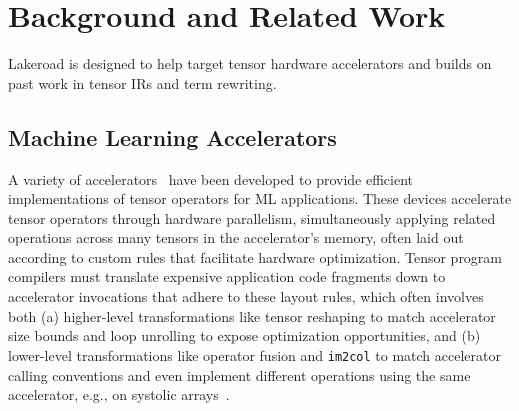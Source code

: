 \documentclass[prologue, dvipsnames, sigplan, screen, review, anonymous]{acmart}
\newcommand{\g}{Lakeroad\xspace}
\newcommand{\tcd}[1]{\texttt{#1}}
\begin{document}


\section{Background and Related Work}
\label{sec:background}

\g is designed to help target
  tensor hardware accelerators and
  builds on past work in
  tensor IRs and term rewriting.



\subsection{Machine Learning Accelerators}

A variety of accelerators~\cite{
    jouppi2017tpu, chen2016eyeriss, moreau2018vta, markidis2018tensorcore, nvdla}
  have been developed 
  to provide efficient implementations
  of tensor operators for ML applications.
These devices accelerate tensor operators 
  through hardware parallelism, 
  simultaneously applying related operations
  across many tensors in the accelerator's memory,
  often laid out according to custom rules
  that facilitate hardware optimization.
Tensor program compilers must translate
  expensive application code fragments
  down to accelerator invocations that
  adhere to these layout rules,
  which often involves both
  (a) higher-level transformations like
  tensor reshaping to match accelerator size bounds and
  loop unrolling to expose optimization opportunities, and
  (b) lower-level transformations like
  operator fusion and \tcd{im2col}
  to match accelerator calling conventions and
  even implement different operations
  using the same accelerator,
  e.g., on systolic arrays~\cite{im2col, jia2014semantic}.
  
\end{document}
